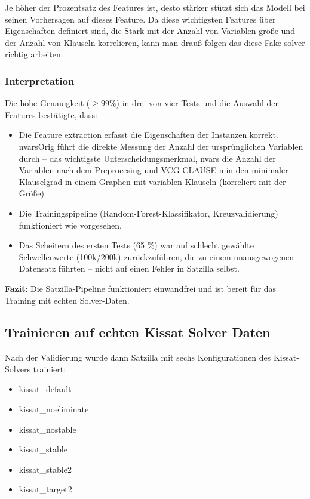 Je höher der Prozentsatz des Features ist, desto stärker stützt sich das Modell bei seinen Vorhersagen 
auf dieses Feature. Da diese wichtigsten Features über Eigenschaften definiert sind, die Stark mit der Anzahl 
von Variablen-größe und der Anzahl von Klauseln korrelieren, kann man drauß folgen das diese Fake solver 
richtig arbeiten.

\subsubsection{Interpretation}


Die hohe Genauigkeit ($\geq 99\%$) in drei von vier Tests und die Auswahl der Features bestätigte, dass:

\begin{itemize}
    \setlength{\itemsep}{0pt}
    \setlength{\parskip}{0pt}
    \setlength{\parsep}{0pt}
    \item Die Feature extraction erfasst die Eigenschaften der Instanzen korrekt. nvarsOrig führt die direkte Messung der Anzahl der ursprünglichen Variablen durch – das wichtigste Unterscheidungsmerkmal, nvars die Anzahl der Variablen nach dem Preprocesing und VCG-CLAUSE-min den minimaler Klauselgrad in einem Graphen mit variablen Klauseln (korreliert mit der Größe) 
    \item Die Trainingspipeline (Random-Forest-Klassifikator, Kreuzvalidierung) funktioniert wie vorgesehen.
    \item Das Scheitern des ersten Tests (65 \%) war auf schlecht gewählte Schwellenwerte (100k/200k) zurückzuführen, die zu einem unausgewogenen Datensatz führten – nicht auf einen Fehler in Satzilla selbst.
\end{itemize}

\textbf{Fazit}: Die Satzilla-Pipeline funktioniert einwandfrei und ist bereit für das Training mit echten Solver-Daten.


\newpage


\subsection{Trainieren auf echten Kissat Solver Daten}

Nach der Validierung wurde dann Satzilla mit sechs Konfigurationen des Kissat-Solvers trainiert:

\begin{itemize}
    \setlength{\itemsep}{0pt}
    \setlength{\parskip}{0pt}
    \setlength{\parsep}{0pt}
    \item kissat\_default
    \item kissat\_noeliminate
    \item kissat\_nostable
    \item kissat\_stable
    \item kissat\_stable2
    \item kissat\_target2
\end{itemize}


